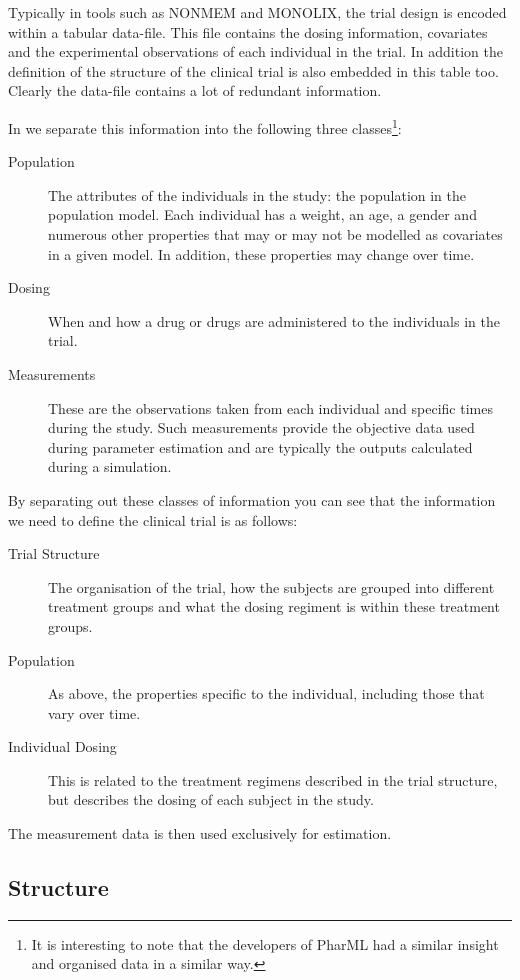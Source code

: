  Typically in tools such as NONMEM and MONOLIX, the trial design is
 encoded within a tabular data-file. This file contains the dosing
 information, covariates and the experimental observations of each
 individual in the trial. In addition the definition of the structure
 of the clinical trial is also embedded in this table too. Clearly the
 data-file contains a lot of redundant information.
 
 In \pharmml we separate this information into the following three
 classes\footnote{It is interesting to note that the developers of
   PharML had a similar insight and organised data in a similar
   way\cite{NLMEcons:2008}.}:
 \begin{description}
 \item[Population] The attributes of the individuals in the study: the
   population in the population model. Each individual has a weight,
   an age, a gender and numerous other properties that may or may not
   be modelled as covariates in a given model. In addition, these
   properties may change over time.
 \item[Dosing] When and how a drug or drugs are administered to the
   individuals in the trial.
 \item[Measurements] These are the observations taken from each
   individual and specific times during the study. Such measurements
   provide the objective data used during parameter estimation and are
   typically the outputs calculated during a simulation.
 \end{description}
 By separating out these classes of information you can see that the
 information we need to define the clinical trial is as follows:
 \begin{description}
 \item[Trial Structure] The organisation of the trial, how the subjects
   are grouped into different treatment groups and what the dosing
   regiment is within these treatment groups.
 \item[Population] As above, the properties specific to the individual,
   including those that vary over time.
 \item[Individual Dosing] This is related to the treatment regimens
   described in the trial structure, but describes the dosing of each
   subject in the study.
 \end{description}
 The measurement data is then used exclusively for estimation.

\subsection{Structure}
\label{subsec:TrialStructure}

